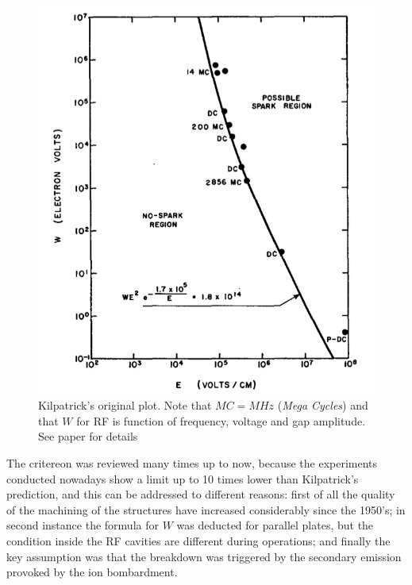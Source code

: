 \begin{figure}[h]
\centering

\includegraphics[scale=0.5]{pictures/kilpatrickCrit}
\caption{Kilpatrick's original plot. Note that $MC = MHz$ (\textit{Mega Cycles}) and that $W$ for RF is function of frequency, voltage and gap amplitude.\\ See paper for details  \cite{KilpLimit}}
\label{kilpPlot}

\end{figure}

The critereon was reviewed many times up to now, because the experiments conducted nowadays show a limit up to 10 times lower than Kilpatrick's prediction, and this can be addressed to different reasons: first of all the quality of the machining of the structures have increased considerably since the 1950's; in second instance the formula for $W$ was deducted for parallel plates, but the condition inside the RF cavities are different during operations; and finally the key assumption was that the breakdown was triggered by the secondary emission provoked by the ion bombardment.


